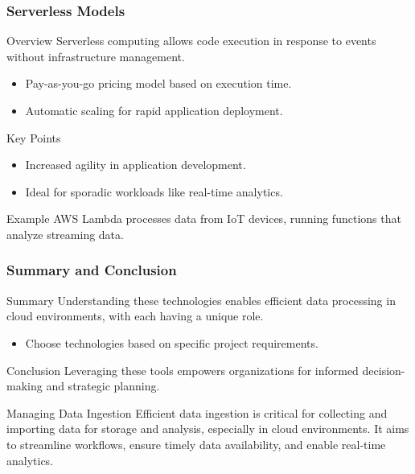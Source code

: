 \documentclass[aspectratio=169]{beamer}
\begin{document}
\begin{frame}[fragile]
    \frametitle{Serverless Models}
    \begin{block}{Overview}
        Serverless computing allows code execution in response to events without infrastructure management.
    \end{block}
    \begin{itemize}
        \item Pay-as-you-go pricing model based on execution time.
        \item Automatic scaling for rapid application deployment.
    \end{itemize}
    \begin{block}{Key Points}
        \begin{itemize}
            \item Increased agility in application development.
            \item Ideal for sporadic workloads like real-time analytics.
        \end{itemize}
    \end{block}
    \begin{block}{Example}
        AWS Lambda processes data from IoT devices, running functions that analyze streaming data.
    \end{block}
\end{frame}

\begin{frame}[fragile]
    \frametitle{Summary and Conclusion}
    \begin{block}{Summary}
        Understanding these technologies enables efficient data processing in cloud environments, with each having a unique role.
    \end{block}
    \begin{itemize}
        \item Choose technologies based on specific project requirements.
    \end{itemize}
    \begin{block}{Conclusion}
        Leveraging these tools empowers organizations for informed decision-making and strategic planning.
    \end{block}
\end{frame}

\begin{frame}[fragile]{Managing Data Ingestion}
  Efficient data ingestion is critical for collecting and importing data for storage and analysis, especially in cloud environments. It aims to streamline workflows, ensure timely data availability, and enable real-time analytics.
\end{frame}
\end{document}
